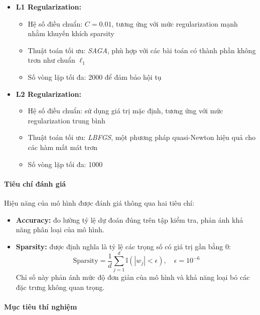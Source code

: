 \begin{itemize}
    \item \textbf{L1 Regularization:}
    \begin{itemize}
        \item Hệ số điều chuẩn: $C = 0.01$, tương ứng với mức regularization mạnh nhằm khuyến khích sparsity
        \item Thuật toán tối ưu: \textit{SAGA}, phù hợp với các bài toán có thành phần không trơn như chuẩn $\ell_1$
        \item Số vòng lặp tối đa: 2000 để đảm bảo hội tụ
    \end{itemize}

    \item \textbf{L2 Regularization:}
    \begin{itemize}
        \item Hệ số điều chuẩn: sử dụng giá trị mặc định, tương ứng với mức regularization trung bình
        \item Thuật toán tối ưu: \textit{LBFGS}, một phương pháp quasi-Newton hiệu quả cho các hàm mất mát trơn
        \item Số vòng lặp tối đa: 1000
    \end{itemize}
\end{itemize}

\paragraph{Tiêu chí đánh giá}

Hiệu năng của mô hình được đánh giá thông qua hai tiêu chí:

\begin{itemize}
    \item \textbf{Accuracy:} đo lường tỷ lệ dự đoán đúng trên tập kiểm tra, phản ánh khả năng phân loại của mô hình.
    
    \item \textbf{Sparsity:} được định nghĩa là tỷ lệ các trọng số có giá trị gần bằng 0:
    \[
    \text{Sparsity} = \frac{1}{d} \sum_{j=1}^{d} \mathbb{I}(|w_j| < \epsilon), \quad \epsilon = 10^{-6}
    \]
    Chỉ số này phản ánh mức độ đơn giản của mô hình và khả năng loại bỏ các đặc trưng không quan trọng.
\end{itemize}

\paragraph{Mục tiêu thí nghiệm}

